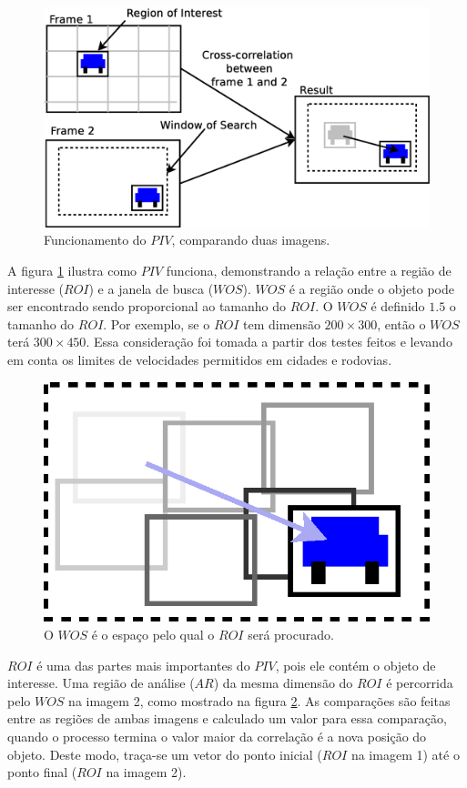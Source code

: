 \begin{figure}[H]
\includegraphics[width=\columnwidth]{images/explanationPIV.eps}
\caption{Funcionamento do $PIV$, comparando duas imagens.}
\label{fig:twoframes}
\end{figure}

A figura \ref{fig:twoframes} ilustra como $PIV$ funciona, demonstrando a relação entre a região de interesse ($ROI$) e 
a janela de busca ($WOS$). $WOS$ é a região onde o objeto pode ser encontrado sendo proporcional ao tamanho do $ROI$.
O $WOS$ é definido $1.5$ o tamanho do $ROI$. Por exemplo, se o $ROI$ tem dimensão $200\times300$, então o $WOS$ terá $300\times450$.
Essa consideração foi tomada a partir dos testes feitos e levando em conta os limites de velocidades permitidos em 
cidades e rodovias.


\begin{figure}[H]
\includegraphics[width=\columnwidth]{images/WOSdivided.eps}
\caption{O $WOS$ é o espaço pelo qual o $ROI$ será procurado.}
\label{fig:WOSdivided}
\end{figure}

$ROI$ é uma das partes mais importantes do $PIV$, pois ele contém o objeto de interesse. Uma região de análise
($AR$) da mesma dimensão do $ROI$ é percorrida pelo $WOS$ na imagem 2, como mostrado na figura \ref{fig:WOSdivided}.
As comparações são feitas entre as regiões de ambas imagens e calculado um valor para essa comparação, quando o processo termina o valor
maior da correlação é a nova posição do objeto. Deste modo, traça-se um vetor do ponto inicial ($ROI$ na imagem 1) até o ponto final
($ROI$ na imagem 2).
